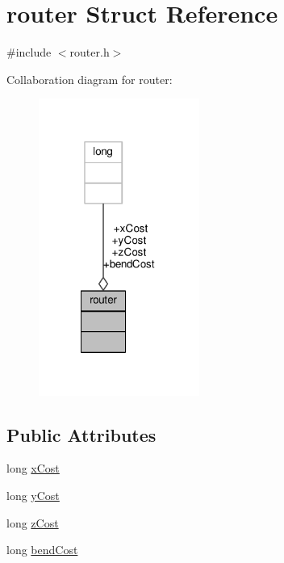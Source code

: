\hypertarget{structrouter}{\section{router Struct Reference}
\label{structrouter}
}


{\ttfamily \#include $<$router.\-h$>$}



Collaboration diagram for router\-:
\nopagebreak
\begin{figure}[H]
\begin{center}
\leavevmode
\includegraphics[width=149pt]{structrouter__coll__graph}
\end{center}
\end{figure}
\subsection*{Public Attributes}
\begin{DoxyCompactItemize}
\item 
long \hyperlink{structrouter_adf1906b1272423e7e652154c78e62527}{x\-Cost}
\item 
long \hyperlink{structrouter_a0f42dd778fc3675ee11bc7cf366f1ee3}{y\-Cost}
\item 
long \hyperlink{structrouter_aad40f5f96b8fc60350a5577104984c3b}{z\-Cost}
\item 
long \hyperlink{structrouter_a18f9e16333db17fda42e0669b79614db}{bend\-Cost}
\end{DoxyCompactItemize}


